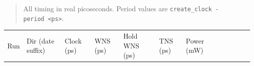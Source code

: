 \begin{record}

\begin{quote}
All timing in real picoseconds. Period values are
\texttt{create\_\allowbreak{}clock\ -\allowbreak{}period\ <ps>}.
\end{quote}

\begin{landscape}
\footnotesize\setlength{\tabcolsep}{3pt}

{
\begin{longtable}[]{@{}
  >{\raggedright\arraybackslash}p{}
  >{\raggedright\arraybackslash}p{}
  >{\raggedright\arraybackslash}p{}
  >{\raggedright\arraybackslash}p{}
  >{\raggedright\arraybackslash}p{}
  >{\raggedright\arraybackslash}p{}
  >{\raggedright\arraybackslash}p{}
  >{\raggedright\arraybackslash}p{}
  >{\raggedright\arraybackslash}p{}
  >{\raggedright\arraybackslash}p{}
  >{\raggedright\arraybackslash}p{}
  >{\raggedright\arraybackslash}p{}@{}}
\toprule\noalign{}
\begin{minipage}[b]{\linewidth}\raggedright
Run
\end{minipage} & \begin{minipage}[b]{\linewidth}\raggedright
Dir (date suffix)
\end{minipage} & \begin{minipage}[b]{\linewidth}\raggedright
Clock (ps)
\end{minipage} & \begin{minipage}[b]{\linewidth}\raggedright
WNS (ps)
\end{minipage} & \begin{minipage}[b]{\linewidth}\raggedright
Hold WNS (ps)
\end{minipage} & \begin{minipage}[b]{\linewidth}\raggedright
TNS (ps)
\end{minipage} & \begin{minipage}[b]{\linewidth}\raggedright
Power (mW)
\end{minipage} & \begin{minipage}[b]{\linewidth}\raggedright

\end{minipage}
\end{longtable}}
\end{landscape}
\end{record}
